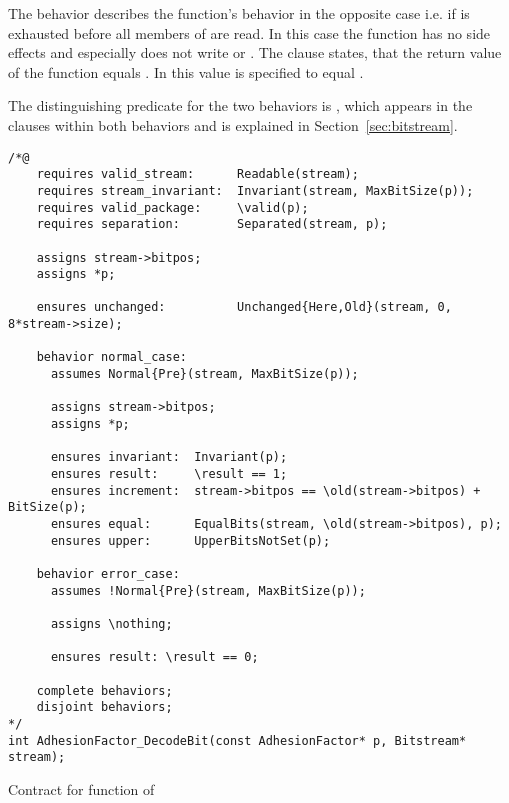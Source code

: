 The behavior  describes the function's behavior in the opposite case
i.e. if  is exhausted before all members of  are read.
In this case the function has no side effects and especially does not write
 or .
The  clause  states, that the return value
of the function equals . In  this value is specified to equal .

The distinguishing predicate for the two behaviors is ,
which appears in the  clauses within both behaviors and
is explained in Section~\ref{sec:bitstream}. 




\begin{listing}[hbt]
\begin{minipage}{0.99\textwidth}
\begin{lstlisting}[style=acsl-block]
/*@
    requires valid_stream:      Readable(stream);
    requires stream_invariant:  Invariant(stream, MaxBitSize(p));
    requires valid_package:     \valid(p);
    requires separation:        Separated(stream, p);

    assigns stream->bitpos;
    assigns *p;

    ensures unchanged:          Unchanged{Here,Old}(stream, 0, 8*stream->size);

    behavior normal_case:
      assumes Normal{Pre}(stream, MaxBitSize(p));

      assigns stream->bitpos;
      assigns *p;

      ensures invariant:  Invariant(p);
      ensures result:     \result == 1;
      ensures increment:  stream->bitpos == \old(stream->bitpos) + BitSize(p);
      ensures equal:      EqualBits(stream, \old(stream->bitpos), p);
      ensures upper:      UpperBitsNotSet(p);

    behavior error_case:
      assumes !Normal{Pre}(stream, MaxBitSize(p));

      assigns \nothing;

      ensures result: \result == 0;

    complete behaviors;
    disjoint behaviors;
*/
int AdhesionFactor_DecodeBit(const AdhesionFactor* p, Bitstream* stream);
\end{lstlisting}
\end{minipage}
\caption{\label{lst:adhesionfactor-decodebit}Contract for  function of }
\end{listing}


